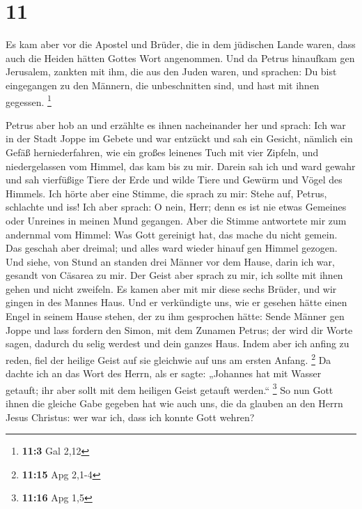 \hypertarget{section-10}{%
\section{11}\label{section-10}}

 Es kam aber vor die Apostel und Brüder, die in dem
jüdischen Lande waren, dass auch die Heiden hätten Gottes Wort
angenommen.  Und da Petrus hinaufkam gen Jerusalem,
zankten mit ihm, die aus den Juden waren,  und sprachen:
Du bist eingegangen zu den Männern, die unbeschnitten sind, und hast mit
ihnen gegessen. \footnote{\textbf{11:3} Gal 2,12}

 Petrus aber hob an und erzählte es ihnen nacheinander her
und sprach:  Ich war in der Stadt Joppe im Gebete und war
entzückt und sah ein Gesicht, nämlich ein Gefäß herniederfahren, wie ein
großes leinenes Tuch mit vier Zipfeln, und niedergelassen vom Himmel,
das kam bis zu mir.  Darein sah ich und ward gewahr und
sah vierfüßige Tiere der Erde und wilde Tiere und Gewürm und Vögel des
Himmels.  Ich hörte aber eine Stimme, die sprach zu mir:
Stehe auf, Petrus, schlachte und iss!  Ich aber sprach: O
nein, Herr; denn es ist nie etwas Gemeines oder Unreines in meinen Mund
gegangen.  Aber die Stimme antwortete mir zum andernmal
vom Himmel: Was Gott gereinigt hat, das mache du nicht gemein.
 Das geschah aber dreimal; und alles ward wieder hinauf
gen Himmel gezogen.  Und siehe, von Stund an standen drei
Männer vor dem Hause, darin ich war, gesandt von Cäsarea zu mir.
 Der Geist aber sprach zu mir, ich sollte mit ihnen gehen
und nicht zweifeln. Es kamen aber mit mir diese sechs Brüder, und wir
gingen in des Mannes Haus.  Und er verkündigte uns, wie
er gesehen hätte einen Engel in seinem Hause stehen, der zu ihm
gesprochen hätte: Sende Männer gen Joppe und lass fordern den Simon, mit
dem Zunamen Petrus;  der wird dir Worte sagen, dadurch du
selig werdest und dein ganzes Haus.  Indem aber ich
anfing zu reden, fiel der heilige Geist auf sie gleichwie auf uns am
ersten Anfang. \footnote{\textbf{11:15} Apg 2,1-4}  Da
dachte ich an das Wort des Herrn, als er sagte: „Johannes hat mit Wasser
getauft; ihr aber sollt mit dem heiligen Geist getauft werden.``
\footnote{\textbf{11:16} Apg 1,5}  So nun Gott ihnen die
gleiche Gabe gegeben hat wie auch uns, die da glauben an den Herrn Jesus
Christus: wer war ich, dass ich konnte Gott wehren?

